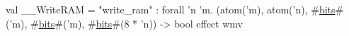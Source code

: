 val __WriteRAM = "write_ram" : forall 'n 'm.
  (atom('m), atom('n), #\hyperref[zbits]{bits}#('m), #\hyperref[zbits]{bits}#('m), #\hyperref[zbits]{bits}#(8 * 'n)) -> bool effect {wmv}
